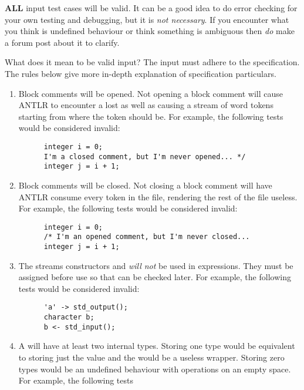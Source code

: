 \documentclass[../gazprea.tex]{subfiles}
\begin{document}
\textbf{ALL} input test cases will be valid. It can be a good idea to do error checking for your
own testing and debugging, but it is \textit{not necessary}. If you encounter what you think is
undefined behaviour or think something is ambiguous then \textit{do} make a forum post about it to
clarify.

What does it mean to be valid input? The input must adhere to the specification. The rules below
give more in-depth explanation of specification particulars.
\begin{enumerate}
  \item
    Block comments will be opened. Not opening a block comment will cause ANTLR to encounter a lost
    \code{*/} as well as causing a stream of word tokens starting from where the \code{/*} token
    should be. For example, the following tests would be considered invalid:
    \begin{lstlisting}
      integer i = 0;
      I'm a closed comment, but I'm never opened... */
      integer j = i + 1;
    \end{lstlisting}
  \item
    Block comments will be closed. Not closing a block comment will have ANTLR consume every token
    in the file, rendering the rest of the file useless. For example, the following tests would be
    considered invalid:
    \begin{lstlisting}
      integer i = 0;
      /* I'm an opened comment, but I'm never closed...
      integer j = i + 1;
    \end{lstlisting}
  \item
    The streams constructors  and  \textit{will not} be used
    in expressions. They must be assigned before use so that  can be checked
    later. For example, the following tests would be considered invalid:
    \begin{lstlisting}
      'a' -> std_output();
      character b;
      b <- std_input();
    \end{lstlisting}
  \item
    A  will have at least two internal types. Storing one type would be equivalent to
    storing just the value and the  would be a useless wrapper. Storing zero types would
    be an undefined behaviour with operations on an empty space. For example, the following tests

\end{enumerate}
\end{document}
